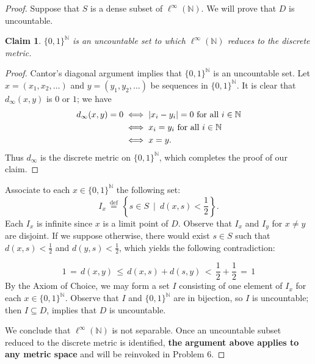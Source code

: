 \documentclass[11pt]{article}
\newtheorem{claim}{Claim}
\begin{document}
\begin{proof}
  Suppose that $S$ is a dense subset of $\ell^{\infty}(\mathbb{N})$. We will prove that $D$ is uncountable.
  \begin{claim}
    $\{ 0, 1 \}^{\mathbb{N}}$ is an uncountable set to which $\ell^{\infty}(\mathbb{N})$ reduces to the discrete metric.
  \end{claim}
  \begin{adjustwidth}{1cm}{}
    \begin{proof}\renewcommand{\qedsymbol}{}
      Cantor's diagonal argument implies that $\{ 0, 1 \}^{\mathbb{N}}$ is an uncountable set. Let $x = (x_{1}, x_{2}, \ldots)$ and $y = (y_{1}, y_{2}, \ldots)$ be sequences in $\{ 0, 1 \}^{\mathbb{N}}$. It is clear that $d_{\infty}(x, y)$ is $0$ or $1$; we have
      \begin{align*}
        \text{$d_{\infty}(x, y) = 0$} &\iff \text{$\abs{x_{i} - y_{i}} = 0$ for all $i \in \mathbb{N}$} \\
                                    &\iff \text{$x_{i} = y_{i}$ for all $i \in \mathbb{N}$} \\
                                    &\iff x = y.
      \end{align*}
      Thus $d_{\infty}$ is the discrete metric on $\{ 0, 1 \}^{\mathbb{N}}$, which completes the proof of our claim.
    \end{proof}
  \end{adjustwidth}
  Associate to each $x \in \{ 0, 1 \}^{\mathbb{N}}$ the following set:
  \[
    I_{x} \, \stackrel{\text{def}}{=} \, \left\{ s \in S \, \, \, \Big| \, \, \, d(x, s) < \frac{1}{2} \right\}.
  \]
  Each $I_{x}$ is infinite since $x$ is a limit point of $D$. Observe that $I_{x}$ and $I_{y}$ for $x \ne y$ are disjoint. If we suppose otherwise, there would exist $s \in S$ such that $d(x, s) < \tfrac{1}{2}$ and $d(y, s) < \tfrac{1}{2}$, which yields the following contradiction:

  \[
    1 \, = \, d(x, y) \, \le \, d(x, s) + d(s, y) \, < \, \frac{1}{2} + \frac{1}{2} \, = \, 1
  \]
  By the Axiom of Choice, we may form a set $I$ consisting of one element of $I_{x}$ for each $x \in \{ 0, 1 \}^{\mathbb{N}}$. Observe that $I$ and $\{ 0, 1 \}^{\mathbb{N}}$ are in bijection, so $I$ is uncountable; then $I \subseteq D$, implies that $D$ is uncountable.

  We conclude that $\ell^{\infty}(\mathbb{N})$ is not separable. Once an uncountable subset reduced to the discrete metric is identified, \textbf{the argument above applies to any metric space} and will be reinvoked in Problem 6.
\end{proof}
\end{document}
